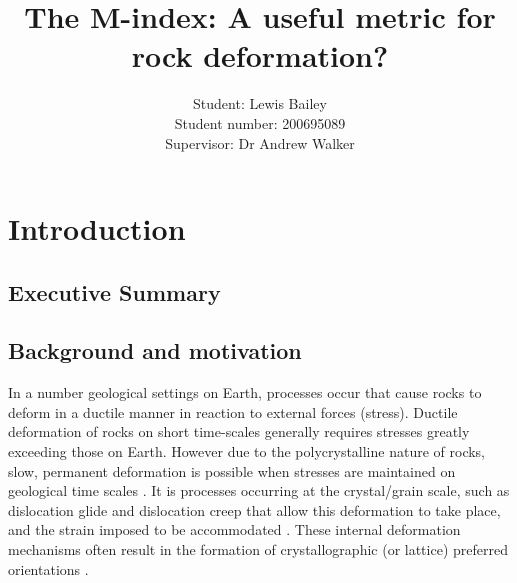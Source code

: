 \documentclass[a4paper,12pt]{report}
\title{\textbf{The M-index: A useful metric for rock deformation?}}
\author{Student: Lewis Bailey\\Student number: 200695089\\Supervisor: Dr Andrew Walker}
\date{}
\numberwithin{equation}{chapter}
\begin{document}

\maketitle

\tableofcontents

\listoffigures
\listoftables

\chapter{Introduction} \label{chap:intro}
\vspace{-1cm}

\section{Executive Summary} \label{sec:summary}

\section{Background and motivation} \label{sec:background}
In a number geological settings on Earth, processes occur that cause rocks to deform in a ductile manner in reaction to external forces (stress). Ductile deformation of rocks on short time-scales generally requires stresses greatly exceeding those on Earth. However due to the polycrystalline nature of rocks, slow, permanent deformation is possible when stresses are maintained on geological time scales \citep{Weiss1985}. It is processes occurring at the crystal/grain scale, such as dislocation glide and dislocation creep that allow this deformation to take place, and the strain imposed to be accommodated \citep{Ashby1972}. These internal deformation mechanisms often result in the formation of crystallographic (or lattice) preferred orientations \citep{Price1985}. 
\end{document}
